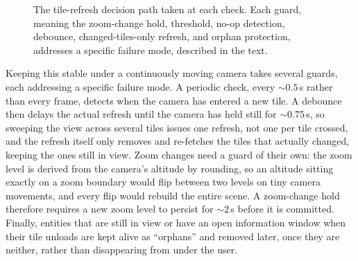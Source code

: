\begin{figure}[t]
  \centering
  \caption[The tile-refresh decision path]{The tile-refresh decision path taken at each check. Each guard, meaning the zoom-change hold, threshold, no-op detection, debounce, changed-tiles-only refresh, and orphan protection, addresses a specific failure mode, described in the text.}
  \label{fig:tile-flow}
\end{figure}

Keeping this stable under a continuously moving camera takes several guards, each addressing a specific failure mode. A periodic check, every ${\sim}0.5$\,s rather than every frame, detects when the camera has entered a new tile. A debounce then delays the actual refresh until the camera has held still for ${\sim}0.75$\,s, so sweeping the view across several tiles issues one refresh, not one per tile crossed, and the refresh itself only removes and re-fetches the tiles that actually changed, keeping the ones still in view. Zoom changes need a guard of their own: the zoom level is derived from the camera's altitude by rounding, so an altitude sitting exactly on a zoom boundary would flip between two levels on tiny camera movements, and every flip would rebuild the entire scene. A zoom-change hold therefore requires a new zoom level to persist for ${\sim}2$\,s before it is committed. Finally, entities that are still in view or have an open information window when their tile unloads are kept alive as ``orphans'' and removed later, once they are neither, rather than disappearing from under the user.

